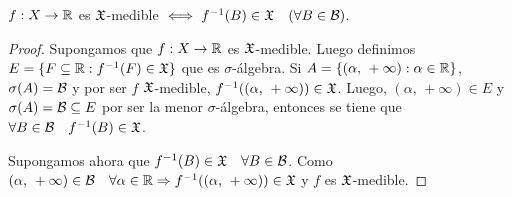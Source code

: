 \begin{prop}
    \(f: X \to \mathbb{R}\) es \(\mathfrak{X}\)-medible \(\iff f^{-1}(B) \in \mathfrak{X} \quad (\forall B \in \mathcal{B})\).
    \begin{proof}
        Supongamos que \(f : X \to \mathbb{R}\) es \(\mathfrak{X}\)-medible. Luego definimos \(E = \{ F \subseteq \mathbb{R} : f^{-1}(F) \in \mathfrak{X} \}\) que es \(\sigma\)-álgebra.
        Si \(A = \{ (\alpha\text{, } +\infty) : \alpha \in \mathbb{R} \}\), \(\sigma(A) = \mathcal{B}\) y por ser \(f\) \(\mathfrak{X}\)-medible, \(f^{-1}((\alpha\text{, } +\infty)) \in \mathfrak{X}\).
        Luego, \((\alpha \text{, } +\infty) \in E\) y \(\sigma(A) = \mathcal{B} \subseteq E\) por ser la menor \(\sigma\)-álgebra, entonces se tiene que \(\forall B \in \mathcal{B} \quad f^{-1}(B) \in \mathfrak{X}\).

        Supongamos ahora que \(f^{-1}(B) \in \mathfrak{X} \quad \forall B \in \mathcal{B}\).
        Como \((\alpha \text{, } +\infty) \in \mathcal{B} \quad \forall \alpha \in \mathbb{R} \Rightarrow f^{-1}((\alpha \text{, } +\infty)) \in \mathfrak{X}\) y \(f\) es \(\mathfrak{X}\)-medible.
    \end{proof}
\end{prop}


